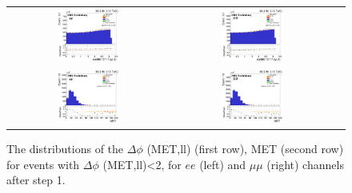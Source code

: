 \begin{figure}[ht]
  \begin{center}
    \begin{tabular}{ccc}
      \includegraphics[width=0.4\textwidth]{figures/tW/fig/Step1/ee_noNvtx/H_MET_Z_T1Txy_phi.png}&
      \includegraphics[width=0.4\textwidth]{figures/tW/fig/Step1/mumu_noNvtx/H_MET_Z_T1Txy_phi.png}\\
      \includegraphics[width=0.4\textwidth]{figures/tW/fig/ee_H_MET_Et.png}&
      \includegraphics[width=0.4\textwidth]{figures/tW/fig/mumu_H_MET_Et.png}\\
    \end{tabular}
    \caption{The distributions of the $\Delta \phi$ (MET,ll) (first row), MET (second row) for events with $\Delta \phi$ (MET,ll)<2, for $ee$ (left) and $\mu\mu$ (right) channels after step 1.
    \label{fig:step1_H_MET_Z_T1Txy_phi}}
  \end{center}
\end{figure}

